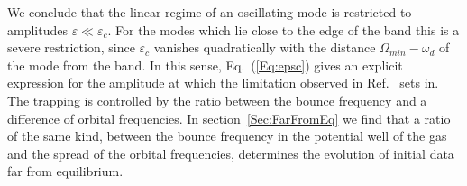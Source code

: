 We conclude that the linear regime of an oscillating mode is restricted to amplitudes $\varepsilon\ll \varepsilon_c$. For the modes which lie close to the edge of the band this is a severe restriction, since $\varepsilon_c$ vanishes quadratically with the distance $\Omega_{min} - \omega_d$ of the mode from the band. In this sense, Eq.~(\ref{Eq:epsc}) gives an explicit expression for the amplitude at which the limitation observed in Ref.~\cite{mW91} sets in. The trapping is controlled by the ratio between the bounce frequency and a difference of orbital frequencies. In section~\ref{Sec:FarFromEq} we find that a ratio of the same kind, between the bounce frequency in the potential well of the gas and the spread of the orbital frequencies, determines the evolution of initial data far from equilibrium. 


